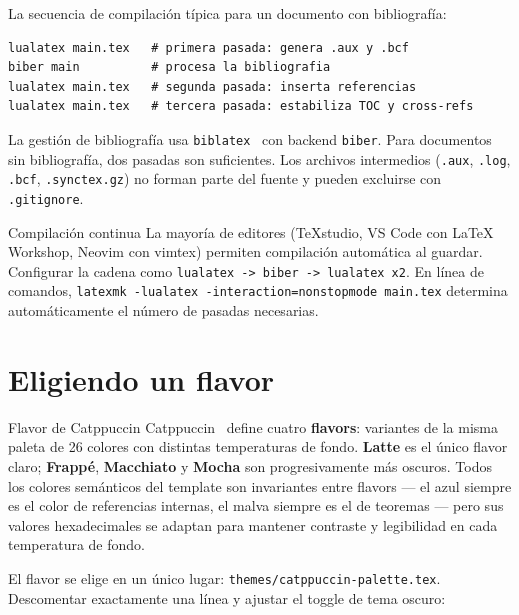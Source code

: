 La secuencia de compilación típica para un documento con bibliografía:

\begin{lstlisting}[style=latex, frame=none, numbers=none]
lualatex main.tex   # primera pasada: genera .aux y .bcf
biber main          # procesa la bibliografia
lualatex main.tex   # segunda pasada: inserta referencias
lualatex main.tex   # tercera pasada: estabiliza TOC y cross-refs
\end{lstlisting}

La gestión de bibliografía usa \texttt{biblatex}~\cite{biblatex2024} con backend \texttt{biber}. Para documentos sin bibliografía, dos pasadas son suficientes. Los archivos
intermedios (\texttt{.aux}, \texttt{.log}, \texttt{.bcf}, \texttt{.synctex.gz})
no forman parte del fuente y pueden excluirse con \texttt{.gitignore}.

\begin{observacion}{Compilación continua}
La mayoría de editores (TeXstudio, VS Code con LaTeX Workshop, Neovim con
vimtex) permiten compilación automática al guardar. Configurar la cadena
como \texttt{lualatex -> biber -> lualatex x2}. En línea de comandos,
\texttt{latexmk -lualatex -interaction=nonstopmode main.tex} determina
automáticamente el número de pasadas necesarias.
\end{observacion}

\section{Eligiendo un flavor}
\label{sec:flavor}

\begin{definicion}{Flavor de Catppuccin}
Catppuccin~\cite{catppuccin-styleguide} define cuatro \textbf{flavors}:
variantes de la misma paleta de 26 colores con distintas temperaturas de
fondo. \textbf{Latte} es el único flavor claro; \textbf{Frappé},
\textbf{Macchiato} y \textbf{Mocha} son progresivamente más oscuros. Todos
los colores semánticos del template son invariantes entre flavors --- el azul
siempre es el color de referencias internas, el malva siempre es el de
teoremas --- pero sus valores hexadecimales se adaptan para mantener contraste
y legibilidad en cada temperatura de fondo.
\end{definicion}

El flavor se elige en un único lugar:
\texttt{themes/catppuccin-palette.tex}. Descomentar exactamente una línea
y ajustar el toggle de tema oscuro:


